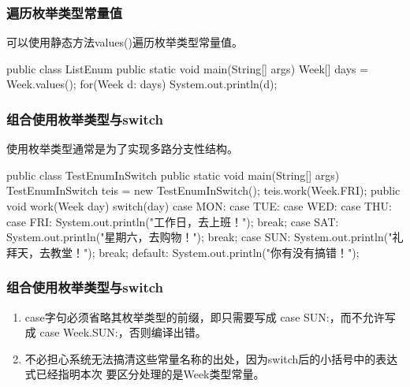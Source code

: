 \begin{frame}[fragile] %
\frametitle{遍历枚举类型常量值}

可以使用静态方法values()遍历枚举类型常量值。

\begin{javaCode}
public class ListEnum {
  public static void main(String[] args) {
    Week[] days = Week.values();
    for(Week d: days) {
      System.out.println(d);
    }
  }
}
\end{javaCode}
\end{frame}

\begin{frame}[fragile] %
\frametitle{组合使用枚举类型与switch}

使用枚举类型通常是为了实现多路分支性结构。

\begin{javaCode}
public class TestEnumInSwitch {
  public static void main(String[] args) {
    TestEnumInSwitch teis = new TestEnumInSwitch();
    teis.work(Week.FRI);
  }
  public void work(Week day) {
    switch(day) {
      case MON:
      case TUE:
      case WED:
      case THU:
      case FRI:
        System.out.println("工作日，去上班！");
        break;
      case SAT:
        System.out.println("星期六，去购物！");
        break;
      case SUN:
        System.out.println("礼拜天，去教堂！");
        break;
      default:
        System.out.println("你有没有搞错！");
    }
  }
}
\end{javaCode}
\end{frame}

\begin{frame}[fragile] %
\frametitle{组合使用枚举类型与switch}

\begin{enumerate}
\item case字句必须省略其枚举类型的前缀，即只需要写成 case SUN:，而不允许写成 case
  Week.SUN:，否则编译出错。
\item 不必担心系统无法搞清这些常量名称的出处，因为switch后的小括号中的表达式已经指明本次
  要区分处理的是Week类型常量。
\end{enumerate}


\end{frame}
% 

